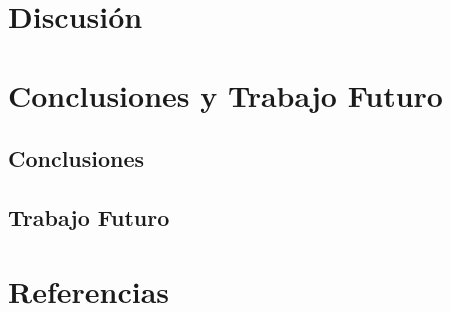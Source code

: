 \documentclass[11pt,a4paper]{article}
\begin{document}

\section{Discusión}


\section{Conclusiones y Trabajo Futuro}

\subsection{Conclusiones}


\subsection{Trabajo Futuro}


\section{Referencias}
\end{document}
